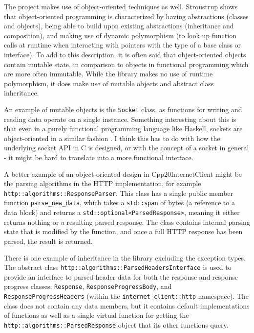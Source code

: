 \documentclass[12pt, a4paper]{article}
\begin{document}
The project makes use of object-oriented techniques as well. Stroustrup \parencite*{CppNotJustObjectOriented} shows that object-oriented programming is characterized by having abstractions (classes and objects), being able to build upon existing abstractions (inheritance and composition), and making use of dynamic polymorphism (to look up function calls at runtime when interacting with pointers with the type of a base class or interface). To add to this description, it is often said that object-oriented objects contain mutable state, in comparison to objects in functional programming which are more often immutable. While the library makes no use of runtime polymorphism, it does make use of mutable objects and abstract class inheritance. 

An example of mutable objects is the \texttt{Socket} class, as functions for writing and reading data operate on a single instance. Something interesting about this is that even in a purely functional programming language like Haskell, sockets are object-oriented in a similar fashion \parencite{HaskellSocket}. I think this has to do with how the underlying socket API in C is designed, or with the concept of a socket in general - it might be hard to translate into a more functional interface. 

A better example of an object-oriented design in Cpp20InternetClient might be the parsing algorithms in the HTTP implementation, for example \\
\texttt{http::algorithms::ResponseParser}. This class has a single public member function \texttt{parse\_new\_data}, which takes a \texttt{std::span} of bytes (a reference to a data block) and returns a \texttt{std::optional<ParsedResponse>}, meaning it either returns nothing or a resulting parsed response. The class contains internal parsing state that is modified by the function, and once a full HTTP response has been parsed, the result is returned.

There is one example of inheritance in the library excluding the exception types. The abstract class \texttt{http::algorithms::ParsedHeadersInterface} is used to provide an interface to parsed header data for both the response and response progress classes; \texttt{Response}, \texttt{ResponseProgressBody}, and \texttt{ResponseProgressHeaders} (within the \texttt{internet\_client::http} namespace). The class does not contain any data members, but it contains default implementations of functions as well as a single virtual function for getting the \texttt{http::algorithms::ParsedResponse} object that its other functions query.
\end{document}
